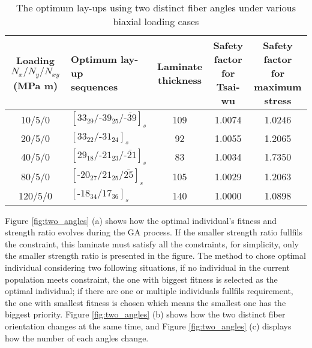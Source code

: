 \begin{table*}
	\normalsize
\caption{The optimum lay-ups using two distinct fiber angles under various biaxial loading cases}
\label{tab:two_distinct_angle}
\centering
\begin{tabular}{clccc}
	\toprule
	\textbf{Loading} $N_{x}/N_{y}/N_{xy}$ \textbf{(MPa m)}   &
	\makecell{\textbf{Optimum lay-up } \\ \textbf{sequences}  }                        &
	\textbf{Laminate thickness} &  \makecell{\textbf{Safety factor } \\
	\textbf{for Tsai-wu}}  &
	\makecell{\textbf{Safety factor } \\ \textbf{for  maximum stress}}
	 \\
	\midrule
	10/5/0                                         &  $[33_{29}/\text{-}39_{25}/\bar{\text{-}39}]_s$            &     109               &  1.0074      &  1.0246  \\
	20/5/0                                         &  $[33_{22}/\text{-}31_{24}]_s$                             &     92               &  1.0055       &  1.2065    \\
	40/5/0                                         &  $[29_{18}/\text{-}21_{23}/\bar{\text{-}21}]_s$            &     83               &  1.0034       &  1.7350   \\
	80/5/0                                         &  $[\text{-}20_{27}/21_{25}/\bar{25}]_s$                    &     105               &  1.0029      &  1.2063    \\
	120/5/0                                         &  $[\text{-}18_{34}/17_{36}]_s$                            &     140               &  1.0000      &  1.0898    \\
	\bottomrule
\end{tabular}
\end{table*}

Figure \ref{fig:two_angles} (a) shows how the optimal individual's fitness and
strength ratio evolves during the GA process. If the smaller strength ratio
fullfils the constraint, this laminate must satisfy all the constraints, for
simplicity, only the smaller strength ratio is presented in the figure. The
method to chose optimal individual considering two following situations, if no
individual in the current population meets constraint, the one with biggest
fitness is selected as the optimal individual; if there are one or multiple
individuals fullfils requirement, the one with smallest fitness is chosen which
means the smallest one has the biggest priority.  Figure \ref{fig:two_angles}
(b) shows how the two distinct fiber orientation changes at the same time, and
Figure \ref{fig:two_angles} (c) displays how the number of each angles change.

